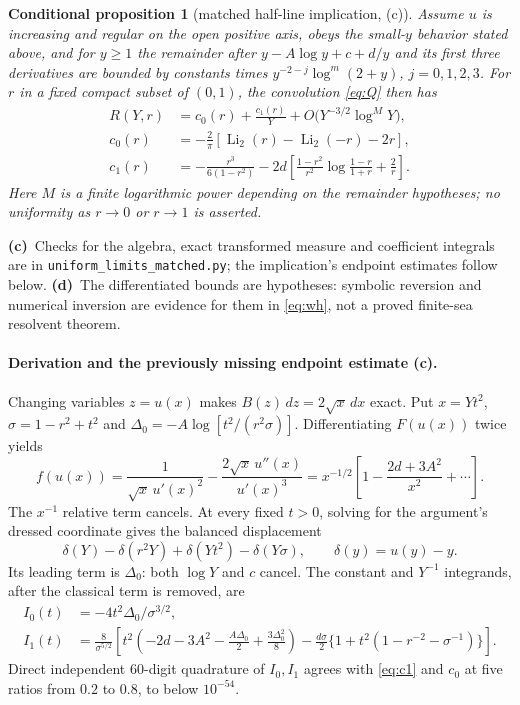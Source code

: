 \documentclass[11pt,a4paper]{article}
\newcommand{\C}{\textbf{(c)}\ }
\newcommand{\D}{\textbf{(d)}\ }
\newcommand{\scr}[1]{\texttt{uniform\_\allowbreak limits\_\allowbreak #1.py}}
\newtheorem{proposition}{Conditional proposition}
\begin{document}
\begin{proposition}[matched half-line implication, (c)]
Assume $u$ is increasing and regular on the open positive axis, obeys the
small-$y$ behavior stated above, and for $y\geq1$ the remainder after
$y-A\log y+c+d/y$ and its first three derivatives are bounded by constants
times $y^{-2-j}\log^m(2+y)$, $j=0,1,2,3$. For $r$ in a fixed compact subset
of $(0,1)$, the convolution \eqref{eq:Q} then has
\begin{align}
 R(Y,r)&=c_0(r)+\frac{c_1(r)}Y
       +O\bigl(Y^{-3/2}\log^M Y\bigr),\label{eq:result}\\
 c_0(r)&=-\frac2\pi[\operatorname{Li}_2(r)-\operatorname{Li}_2(-r)-2r],\nonumber\\
 c_1(r)&=-\frac{r^3}{6(1-r^2)}
 -2d\left[\frac{1-r^2}{r^2}\log\frac{1-r}{1+r}+\frac2r\right].\label{eq:c1}
\end{align}
Here $M$ is a finite logarithmic power depending on the remainder hypotheses;
no uniformity as $r\to0$ or $r\to1$ is asserted.
\end{proposition}
\C Checks for the algebra, exact transformed measure and coefficient
integrals are in \scr{matched}; the implication's endpoint estimates follow
below. \D The differentiated bounds are hypotheses: symbolic reversion and
numerical inversion are evidence for them in \eqref{eq:wh}, not a proved
finite-sea resolvent theorem.

\paragraph{Derivation and the previously missing endpoint estimate (c).}
Changing variables $z=u(x)$ makes $B(z)\,dz=2\sqrt{x}\,dx$ exact. Put
$x=Yt^2$, $\sigma=1-r^2+t^2$ and
$\Delta_0=-A\log[t^2/(r^2\sigma)]$. Differentiating $F(u(x))$ twice yields
\begin{equation}
 f(u(x))=\frac1{\sqrt{x}\,u'(x)^2}
 -\frac{2\sqrt{x}\,u''(x)}{u'(x)^3}
 =x^{-1/2}\left[1-\frac{2d+3A^2}{x^2}+\cdots\right].
\end{equation}
The $x^{-1}$ relative term cancels. At every fixed $t>0$, solving for the
argument's dressed coordinate gives the balanced displacement
\begin{equation}
 \delta(Y)-\delta(r^2Y)+\delta(Yt^2)-\delta(Y\sigma),
 \qquad\delta(y)=u(y)-y.
\end{equation}
Its leading term is $\Delta_0$: both $\log Y$ and $c$ cancel.
The constant and $Y^{-1}$ integrands, after the classical term is removed, are
\begin{align}
 I_0(t)&=-4t^2\Delta_0/\sigma^{3/2},\\
 I_1(t)&=\frac8{\sigma^{5/2}}
 \left[t^2\left(-2d-3A^2-\frac{A\Delta_0}{2}
                       +\frac{3\Delta_0^2}{8}\right)
 -\frac{d\sigma}{2}\{1+t^2(1-r^{-2}-\sigma^{-1})\}\right].
\end{align}
Direct independent 60-digit quadrature of $I_0,I_1$ agrees with
\eqref{eq:c1} and $c_0$ at five ratios from $0.2$ to $0.8$, to below $10^{-54}$.
\end{document}
